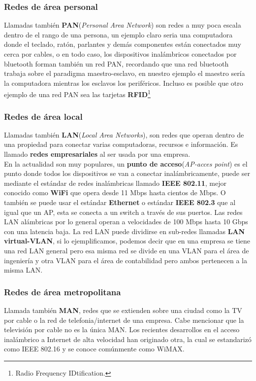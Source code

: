 \documentclass[
	12pt, %
	fleqn, %
	a4paper, %
	oneside, %
]{LegrandOrangeBook}
\begin{document}
\subsubsection{Redes de área personal}
Llamadas también \textbf{PAN}(\textit{Personal Area Network}) son redes a muy poca escala dentro de el rango de una persona, un ejemplo claro seria una computadora donde el teclado, ratón, parlantes y demás componentes están conectados muy cerca por cables, o en todo caso, los dispositivos inalámbricos conectados por bluetooth forman también un red PAN, recordando que una red bluetooth trabaja sobre el paradigma maestro-esclavo, en nuestro ejemplo el maestro sería la computadora mientras los esclavos los periféricos. Incluso es posible que otro ejemplo de una red PAN sea las tarjetas \textbf{RFID}\footnote{Radio Frequency IDtification.}
\subsubsection{Redes de área local}
Llamadas también \textbf{LAN}(\textit{Local Area Networks}), son redes que operan dentro de una propiedad para conectar varias computadoras, recursos e información. Es llamado \textbf{redes empresariales} al ser usada por una empresa.\\
En la actualidad son muy populares, un \textbf{punto de acceso}(\textit{AP-acces point}) es el punto donde todos los dispositivos se van a conectar inalámbricamente, puede ser mediante el estándar de redes inalámbricas llamado \textbf{IEEE 802.11}, mejor conocido como \textbf{WiFi} que opera desde 11 Mbps hasta cientos de Mbps. O también se puede usar el estándar \textbf{Ethernet} o estándar \textbf{IEEE 802.3} que al igual que un AP, esta se conecta a un switch a través de sus puertos. Las redes LAN alámbricas por lo general operan a velocidades de 100 Mbps hasta 10 Gbps con una latencia baja. La red LAN puede dividirse en sub-redes llamadas \textbf{LAN virtual-VLAN}, si lo ejemplificamos, podemos decir que en una empresa se tiene una red LAN general pero esa misma red se divide en una VLAN para el área de ingeniería y otra VLAN para el área de contabilidad pero ambos pertenecen a la misma LAN.
\subsubsection{Redes de área metropolitana}
Llamada también \textbf{MAN}, redes que se extienden sobre una ciudad como la TV por cable o la red de telefonia/internet de una empresa. Cabe mencionar que la televisión por cable no es la única MAN. Los recientes desarrollos en
el acceso inalámbrico a Internet de alta velocidad han originado otra, la cual se estandarizó como IEEE 802.16 y se conoce comúnmente como WiMAX.
\end{document}
